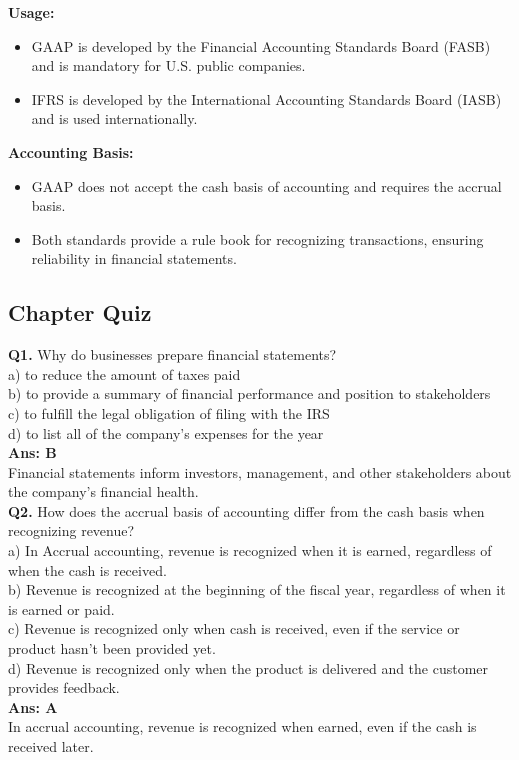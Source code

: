 \documentclass[12pt]{article}
\begin{document}
\textbf{Usage:}
\begin{itemize}
\item GAAP is developed by the Financial Accounting Standards Board (FASB) and is mandatory for U.S. public companies.
\item IFRS is developed by the International Accounting Standards Board (IASB) and is used internationally.
\end{itemize}

\textbf{Accounting Basis:}
\begin{itemize}
\item GAAP does not accept the cash basis of accounting and requires the accrual basis.
\item Both standards provide a rule book for recognizing transactions, ensuring reliability in financial statements.
\end{itemize}


\subsection{Chapter Quiz}
\textbf{Q1.} Why do businesses prepare financial statements?\\
a) to reduce the amount of taxes paid\\
 b) to provide a summary of financial performance and position to stakeholders\\
 c) to fulfill the legal obligation of filing with the IRS\\
 d) to list all of the company's expenses for the year\\
\textbf{Ans: B}\\
Financial statements inform investors, management, and other stakeholders about the company’s financial health.\\
\textbf{Q2.} How does the accrual basis of accounting differ from the cash basis when recognizing revenue?\\
a) In Accrual accounting, revenue is recognized when it is earned, regardless of when the cash is received.\\
b) Revenue is recognized at the beginning of the fiscal year, regardless of when it is earned or paid.\\
c) Revenue is recognized only when cash is received, even if the service or product hasn't been provided yet.\\
d) Revenue is recognized only when the product is delivered and the customer provides feedback.\\
\textbf{Ans: A}\\
In accrual accounting, revenue is recognized when earned, even if the cash is received later.\\
\end{document}
